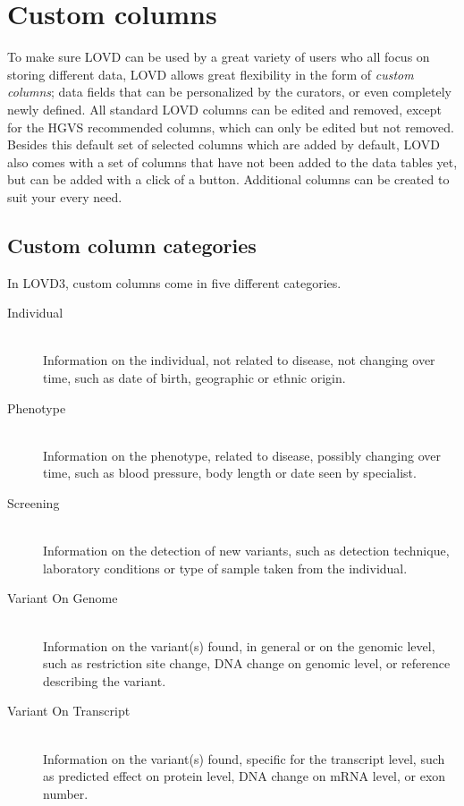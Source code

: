 \chapter{Custom columns}
\label{chap:custom_columns}
To make sure LOVD can be used by a great variety of users who all focus on storing different data,
 LOVD allows great flexibility in the form of \emph{custom columns}; data fields that can be personalized by the curators,
 or even completely newly defined.
All standard LOVD columns can be edited and removed, except for the HGVS recommended columns,
 which can only be edited but not removed.
Besides this default set of selected columns which are added by default,
 LOVD also comes with a set of columns that have not been added to the data tables yet,
 but can be added with a click of a button.
Additional columns can be created to suit your every need.





\hypertarget{sec:custom_column_categories}{}
\section{Custom column categories}
\label{sec:custom_column_categories}
In LOVD3, custom columns come in five different categories.
\begin{description}
  \item[Individual] \hfill \\
  Information on the individual, not related to disease, not changing over time, such as date of birth, geographic or ethnic origin.
  \item[Phenotype] \hfill \\
  Information on the phenotype, related to disease, possibly changing over time, such as blood pressure, body length or date seen by specialist.
  \item[Screening] \hfill \\
  Information on the detection of new variants, such as detection technique, laboratory conditions or type of sample taken from the individual.
  \item[Variant On Genome] \hfill \\
  Information on the variant(s) found, in general or on the genomic level, such as restriction site change, DNA change on genomic level, or reference describing the variant.
  \item[Variant On Transcript] \hfill \\
  Information on the variant(s) found, specific for the transcript level, such as predicted effect on protein level, DNA change on mRNA level, or exon number.
\end{description}

